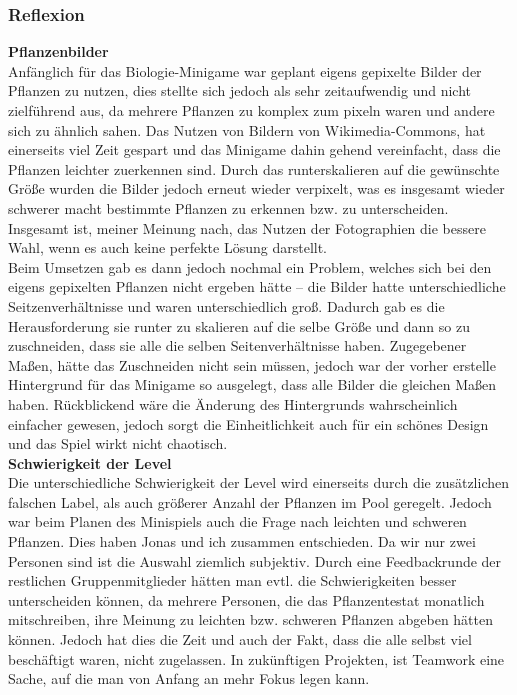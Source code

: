 \subsubsection{Reflexion}
\textbf{Pflanzenbilder} \\
Anfänglich für das Biologie-Minigame war geplant eigens gepixelte Bilder der Pflanzen zu nutzen, dies stellte sich jedoch als sehr zeitaufwendig und nicht zielführend aus, da mehrere Pflanzen zu komplex zum pixeln waren und andere sich zu ähnlich sahen.
Das Nutzen von Bildern von Wikimedia-Commons, hat einerseits viel Zeit gespart und das Minigame dahin gehend vereinfacht, dass die Pflanzen leichter zuerkennen sind. Durch das runterskalieren auf die gewünschte Größe wurden die Bilder jedoch erneut wieder verpixelt, was es insgesamt wieder schwerer macht bestimmte Pflanzen zu erkennen bzw. zu unterscheiden.
Insgesamt ist, meiner Meinung nach, das Nutzen der Fotographien die bessere Wahl, wenn es auch keine perfekte Lösung darstellt. \\
Beim Umsetzen gab es dann jedoch nochmal ein Problem, welches sich bei den eigens gepixelten Pflanzen nicht ergeben hätte – die Bilder hatte unterschiedliche Seitzenverhältnisse und waren unterschiedlich groß. Dadurch gab es die Herausforderung sie runter zu skalieren auf die selbe Größe und dann so zu zuschneiden, dass sie alle die selben Seitenverhältnisse haben.
Zugegebener Maßen, hätte das Zuschneiden nicht sein müssen, jedoch war der vorher erstelle Hintergrund für das Minigame so ausgelegt, dass alle Bilder die gleichen Maßen haben. Rückblickend wäre die Änderung des Hintergrunds wahrscheinlich einfacher gewesen, jedoch sorgt die Einheitlichkeit auch für ein schönes Design und das Spiel wirkt nicht chaotisch. \\
\textbf{Schwierigkeit der Level} \\
Die unterschiedliche Schwierigkeit der Level wird einerseits durch die zusätzlichen falschen Label, als auch größerer Anzahl der Pflanzen im Pool geregelt. Jedoch war beim Planen des Minispiels auch die Frage nach \glqq{}leichten\grqq{} und \glqq{}schweren\grqq{} Pflanzen. Dies haben Jonas und ich zusammen entschieden. Da wir nur zwei Personen sind ist die Auswahl ziemlich subjektiv.
Durch eine Feedbackrunde der restlichen Gruppenmitglieder hätten man evtl. die Schwierigkeiten besser unterscheiden können, da mehrere Personen, die das Pflanzentestat monatlich mitschreiben, ihre Meinung zu leichten bzw. schweren Pflanzen abgeben hätten können.
Jedoch hat dies die Zeit und auch der Fakt, dass die alle selbst viel beschäftigt waren, nicht zugelassen. In zukünftigen Projekten, ist Teamwork eine Sache, auf die man von Anfang an mehr Fokus legen kann. \\
